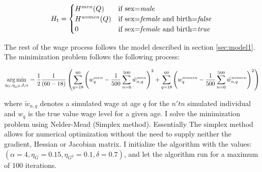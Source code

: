 \begin{equation}
    H_t = \begin{cases}
        H^{men}(Q) & \text{if sex=\textit{male}} \\
        H^{women}(Q) & \text{if sex=\textit{female} and birth=\textit{false}} \\
        0 & \text{if sex=\textit{female} and birth=\textit{true} }\\
    \end{cases}    
\end{equation}

The rest of the wage process follows the model described in section \ref{sec:model1}. The minimization problem follows the following process:

\begin{equation}
    \underset{\eta_G, \eta_{G^2}, \delta, \alpha}{\operatorname*{arg\,min}} = \frac{1}{2}\frac{1}{(60 - 18)} \left( \sum_{q=18}^{60} \left( w^{men}_{q} - \frac{1}{500}\sum_{n=0}^{500}\tilde{w}^{men}_{n,q} \right) ^2 + \sum_{q=18}^{60} \left( w^{women}_{q} - \frac{1}{500}\sum_{n=0}^{500}\tilde{w}^{women}_{n,q} \right) ^2 \right)
\end{equation}

where $\tilde{w}_{n, q}$ denotes a simulated wage at age $q$ for the $n'tn$ simulated individual and $w_q$ is the true value wage level for a given age. I solve the minimization problem using Nelder-Mead (Simplex method). Essentially The simplex method allows for numerical optimization without the need to supply neither the gradient, Hessian or Jacobian matrix. I initialize the algorithm with the values: $(\alpha=4, \eta_G = 0.15, \eta_{G^2}=0.1, \delta=0.7)$, and let the algorithm run for a maximum of 100 iterations. 